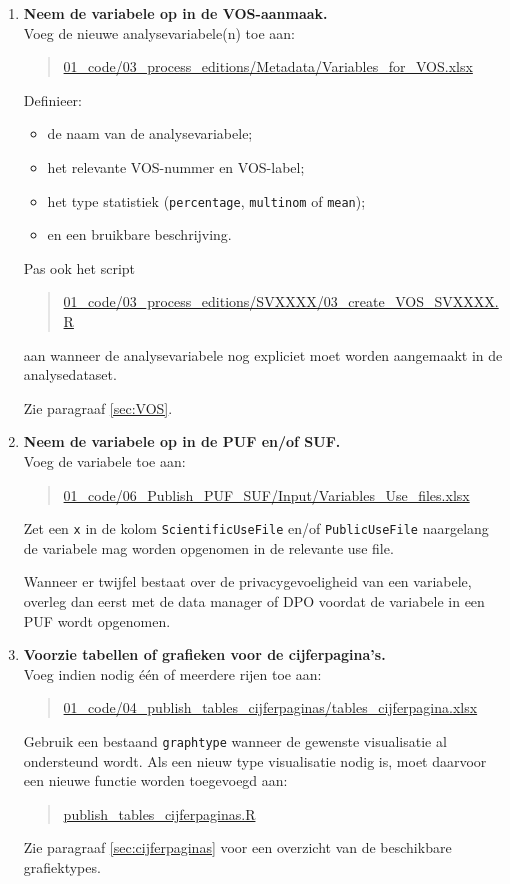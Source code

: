 \documentclass{VSAnote}
\begin{document}
\begin{enumerate}
Documenteer zulke wijzigingen via Roxygen2 in de code zelf. Wees voorzichtig met wijzigingen in deze functie, omdat ze impact hebben op alle edities.

\item \textbf{Neem de variabele op in de VOS-aanmaak.}\\
Voeg de nieuwe analysevariabele(n) toe aan:
\begin{quote}
\url{01_code/03_process_editions/Metadata/Variables_for_VOS.xlsx}
\end{quote}

Definieer:
\begin{itemize}[nosep]
\item de naam van de analysevariabele;
\item het relevante VOS-nummer en VOS-label;
\item het type statistiek (\verb+percentage+, \verb+multinom+ of \verb+mean+);
\item en een bruikbare beschrijving.
\end{itemize}

Pas ook het script
\begin{quote}
\url{01_code/03_process_editions/SVXXXX/03_create_VOS_SVXXXX.R}
\end{quote}
aan wanneer de analysevariabele nog expliciet moet worden aangemaakt in de analysedataset.

Zie paragraaf \ref{sec:VOS}.

\item \textbf{Neem de variabele op in de PUF en/of SUF.}\\
Voeg de variabele toe aan:
\begin{quote}
\url{01_code/06_Publish_PUF_SUF/Input/Variables_Use_files.xlsx}
\end{quote}

Zet een \verb+x+ in de kolom \verb+ScientificUseFile+ en/of \verb+PublicUseFile+ naargelang de variabele mag worden opgenomen in de relevante use file.

Wanneer er twijfel bestaat over de privacygevoeligheid van een variabele, overleg dan eerst met de data manager of DPO voordat de variabele in een PUF wordt opgenomen.

\item \textbf{Voorzie tabellen of grafieken voor de cijferpagina's.}\\
Voeg indien nodig één of meerdere rijen toe aan:
\begin{quote}
\url{01_code/04_publish_tables_cijferpaginas/tables_cijferpagina.xlsx}
\end{quote}

Gebruik een bestaand \verb+graphtype+ wanneer de gewenste visualisatie al ondersteund wordt. Als een nieuw type visualisatie nodig is, moet daarvoor een nieuwe functie worden toegevoegd aan:
\begin{quote}
\url{publish_tables_cijferpaginas.R}
\end{quote}

Zie paragraaf \ref{sec:cijferpaginas} voor een overzicht van de beschikbare grafiektypes.

\end{enumerate}
\end{document}
